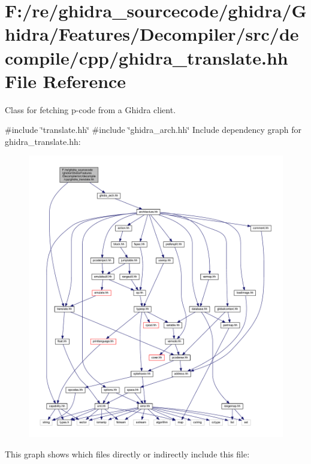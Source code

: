 \hypertarget{ghidra__translate_8hh}{}\section{F\+:/re/ghidra\+\_\+sourcecode/ghidra/\+Ghidra/\+Features/\+Decompiler/src/decompile/cpp/ghidra\+\_\+translate.hh File Reference}
\label{ghidra__translate_8hh}


Class for fetching p-\/code from a Ghidra client.  


{\ttfamily \#include \char`\"{}translate.\+hh\char`\"{}}\newline
{\ttfamily \#include \char`\"{}ghidra\+\_\+arch.\+hh\char`\"{}}\newline
Include dependency graph for ghidra\+\_\+translate.\+hh\+:
\nopagebreak
\begin{figure}[H]
\begin{center}
\leavevmode
\includegraphics[width=350pt]{ghidra__translate_8hh__incl}
\end{center}
\end{figure}
This graph shows which files directly or indirectly include this file\+:
